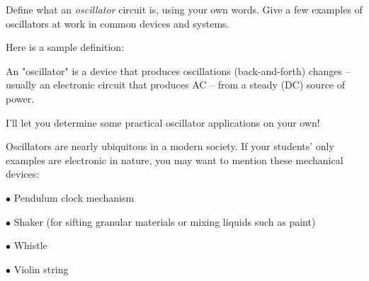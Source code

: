 

Define what an {\it oscillator} circuit is, using your own words.  Give a few examples of oscillators at work in common devices and systems.







Here is a sample definition:

\vskip 10pt {\narrower \noindent \baselineskip5pt

An "oscillator" is a device that produces oscillations (back-and-forth) changes -- usually an electronic circuit that produces AC -- from a steady (DC) source of power.

\par} \vskip 10pt

I'll let you determine some practical oscillator applications on your own!







Oscillators are nearly ubiquitous in a modern society.  If your students' only examples are electronic in nature, you may want to mention these mechanical devices:

\medskip
\goodbreak
\item{$\bullet$} Pendulum clock mechanism
\item{$\bullet$} Shaker (for sifting granular materials or mixing liquids such as paint)
\item{$\bullet$} Whistle
\item{$\bullet$} Violin string
\medskip




